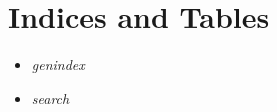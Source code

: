 \documentclass[letterpaper,10pt,english]{sphinxmanual}
\begin{document}
\chapter{Indices and Tables}
\label{index:indices-and-tables}\begin{itemize}
\item {} 
\emph{genindex}

\item {} 
\emph{search}

\end{itemize}



\renewcommand{\indexname}{Index}
\printindex
\end{document}
